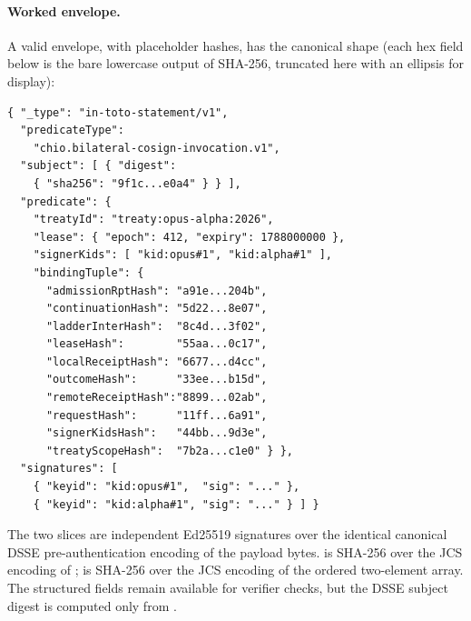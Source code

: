 \paragraph{Worked envelope.} A valid envelope, with placeholder hashes, has the canonical shape (each hex field below is the bare lowercase output of SHA-256, truncated here with an ellipsis for display):
\begin{small}
\begin{verbatim}
{ "_type": "in-toto-statement/v1",
  "predicateType":
    "chio.bilateral-cosign-invocation.v1",
  "subject": [ { "digest":
    { "sha256": "9f1c...e0a4" } } ],
  "predicate": {
    "treatyId": "treaty:opus-alpha:2026",
    "lease": { "epoch": 412, "expiry": 1788000000 },
    "signerKids": [ "kid:opus#1", "kid:alpha#1" ],
    "bindingTuple": {
      "admissionRptHash": "a91e...204b",
      "continuationHash": "5d22...8e07",
      "ladderInterHash":  "8c4d...3f02",
      "leaseHash":        "55aa...0c17",
      "localReceiptHash": "6677...d4cc",
      "outcomeHash":      "33ee...b15d",
      "remoteReceiptHash":"8899...02ab",
      "requestHash":      "11ff...6a91",
      "signerKidsHash":   "44bb...9d3e",
      "treatyScopeHash":  "7b2a...c1e0" } },
  "signatures": [
    { "keyid": "kid:opus#1",  "sig": "..." },
    { "keyid": "kid:alpha#1", "sig": "..." } ] }
\end{verbatim}
\end{small}
The two  slices are independent Ed25519 signatures over the identical canonical DSSE pre-authentication encoding of the payload bytes.  is SHA-256 over the JCS encoding of ;  is SHA-256 over the JCS encoding of the ordered two-element  array. The structured fields remain available for verifier checks, but the DSSE subject digest is computed only from .

